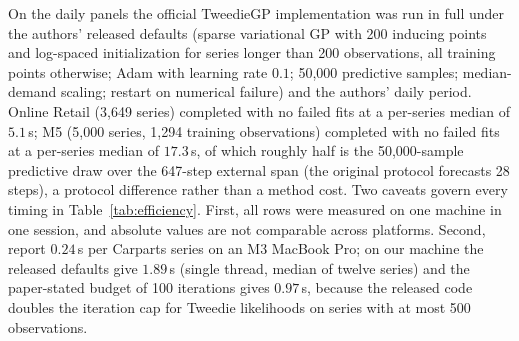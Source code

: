 On the daily panels the official TweedieGP implementation was run in full
under the authors' released defaults (sparse variational GP with 200
inducing points and log-spaced initialization for series longer than 200
observations, all training points otherwise; Adam with learning rate
$0.1$; 50{,}000 predictive samples; median-demand scaling; restart on
numerical failure) and the authors' daily period. Online Retail
(3{,}649 series) completed with no failed fits at a per-series median of
$5.1$\,s; M5 (5{,}000 series, 1{,}294 training observations) completed
with no failed fits at a per-series median of $17.3$\,s, of which roughly
half is the 50{,}000-sample predictive draw over the 647-step external
span (the original protocol forecasts 28 steps), a protocol difference
rather than a method cost. Two caveats govern every timing in
Table~\ref{tab:efficiency}. First, all rows were measured on one machine
in one session, and absolute values are not comparable across platforms.
Second, \citet{damato2025} report $0.24$\,s per Carparts series on an M3
MacBook Pro; on our machine the released defaults give $1.89$\,s (single
thread, median of twelve series) and the paper-stated budget of 100
iterations gives $0.97$\,s, because the released code doubles the
iteration cap for Tweedie likelihoods on series with at most 500
observations.

